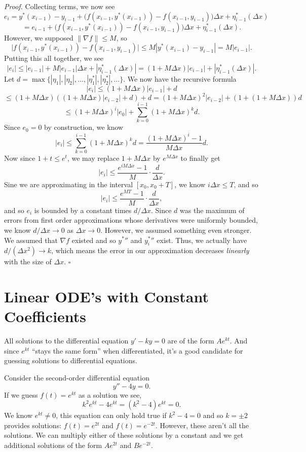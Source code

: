 \documentclass{problemset}
\newenvironment{proof}{\emph{Proof.}}{\hfill$\square$}
\begin{document}
\begin{proof}
		Collecting terms, we now see
		\[
			e_i = y^*(x_{i-1})-y_{i-1} + \Big(f(x_{i-1}, y^*(x_{i-1})) - f(x_{i-1}, y_{i-1}) \Big)\Delta x + \eta^*_{i-1}(\Delta x)
		\]\[
			=e_{i-1} + \Big(f(x_{i-1}, y^*(x_{i-1})) - f(x_{i-1}, y_{i-1}) \Big)\Delta x + \eta^*_{i-1}(\Delta x).
		\]
		However, we supposed $\|\nabla f\| \leq M$, so 
		\[
			\big|f(x_{i-1}, y^*(x_{i-1})) - f(x_{i-1}, y_{i-1})\big| \leq M|y^*(x_{i-1}) -  y_{i-1}|
			= M|e_{i-1}|.
		\]
		Putting this all together, we see
		\[
			|e_i| \leq |e_{i-1}| + M|e_{i-1}|\Delta x + |\eta^*_{i-1}(\Delta x)|
			= (1+M\Delta x)|e_{i-1}| + |\eta^*_{i-1}(\Delta x)|.
		\]
		Let $d = \max\{|\eta_1|,|\eta_2|,\ldots,|\eta_1^*|,|\eta_2^*|,\ldots\}$.  We now have the recursive formula
		\[
			|e_i| \leq  (1+M\Delta x)|e_{i-1}| + d
		\]
		\[
			\leq (1+M\Delta x)((1+M\Delta x)|e_{i-2}| + d) + d = (1+M\Delta x)^2|e_{i-2}| + (1+(1+M\Delta x))d
		\]
		\[
			\leq (1+M\Delta x)^i|e_{0}| + \sum_{k=0}^{i-1} (1+M\Delta x)^k d.
		\]
		Since $e_0=0$ by construction, we know
		\[
			|e_i| \leq \sum_{k=0}^{i-1} (1+M\Delta x)^k d  = \frac{(1+M\Delta x)^i - 1}{M\Delta x} d.
		\]
		Now since $1+t \leq e^t$, we may replace $1+M\Delta x$ by $e^{M\Delta x}$ to finally get
		\[
			|e_i| \leq \frac{e^{iM\Delta x}-1}{M}\cdot \frac{d}{\Delta x}.
		\]
		Sine we are approximating in the interval $[x_0,x_0+T]$, we know $i\Delta x\leq T$, and so
		\[
			|e_i| \leq \frac{e^{MT}-1}{M}\cdot \frac{d}{\Delta x},
		\]
		and so $e_i$ is bounded by a constant times $d/\Delta x$.  Since $d$ was the maximum of errors
		from first order approximations whose derivatives were uniformly bounded, we know $d/\Delta x\to 0$
		as $\Delta x\to 0$.  However, we assumed something even stronger.  We assumed that
		$\nabla f$ existed and so ${y^*}''$ and ${y^*_i}''$ exist.  Thus, we actually have $d/(\Delta x^2)\to k$,
		which means the error in our approximation decreases \emph{linearly} with the size of $\Delta x$.
	\end{proof}

\section*{Linear ODE's with Constant Coefficients}

	All solutions to the differential equation $y'-ky=0$ are of the form $Ae^{kt}$.  And since 
	$e^{kt}$ ``stays the same form'' when differentiated, it's a good candidate for guessing
	solutions to differential equations.

	Consider the second-order differential equation
	\[
		y'' -4y=0.
	\]
	If we guess $f(t)=e^{kt}$ as a solution we see,
	\[
		k^2e^{kt}-4e^{kt} =(k^2-4)e^{kt}=0.
	\]
	We know $e^{kt}\neq 0$, this equation can only hold true if $k^2-4=0$ and so $k=\pm 2$ provides solutions: $f(t)=e^{2t}$
	and $f(t)=e^{-2t}$.  However, these aren't all the solutions.  We can multiply either of these solutions by a constant and
	we get additional solutions of the form $Ae^{2t}$ and $Be^{-2t}$.
\end{document}
